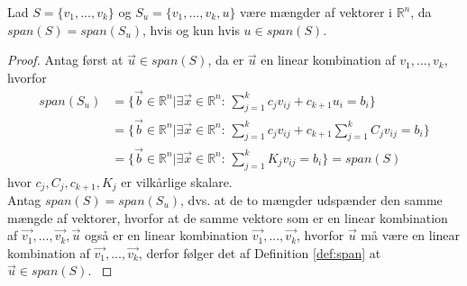 \begin{stn}
Lad $S = \{v_1,...,v_k\}$ og $S_u = \{v_1,...,v_k, u\}$ være mængder af vektorer i $\mathds{R}^n$, da $span(S) = span(S_u)$, hvis og kun hvis $u \in span(S)$.
\end{stn}
\begin{proof}
Antag først at $\vec{u} \in span(S)$, da er $\vec{u}$ en linear kombination af $v_1,..., v_k$, hvorfor
\begin{align*}
span(S_u) &= \{ \vec{b} \in \mathds{R}^n| \exists \vec{x} \in \mathds{R}^n: \, \sum_{j=1}^k c_j v_{ij} + c_{k+1} u_i  = b_i\}
\\&= \{ \vec{b} \in \mathds{R}^n| \exists \vec{x} \in \mathds{R}^n: \, \sum_{j=1}^k c_j v_{ij} + c_{k+1} \sum_{j=1}^k C_j v_{ij}  = b_i\}
\\&= \{ \vec{b} \in \mathds{R}^n| \exists \vec{x} \in \mathds{R}^n: \, \sum_{j=1}^k K_j v_{ij}  = b_i\} = span(S)
\end{align*}
hvor $c_j, C_j, c_{k+1}, K_j$ er vilkårlige skalare.
\\ Antag $span(S) = span(S_u)$, dvs. at de to mængder udspænder den samme mængde af vektorer, hvorfor at de samme vektore som er en linear kombination af $\vec{v_1},...,\vec{v_k}, \vec{u}$ også er en linear kombination $\vec{v_1},..., \vec{v_k}$, hvorfor $\vec{u}$ må være en linear kombination af  $\vec{v_1},..., \vec{v_k}$, derfor følger det af Definition \ref{def:span} at $\vec{u} \in span(S).$
\label{stn:akvivalentespan}
\end{proof}


%